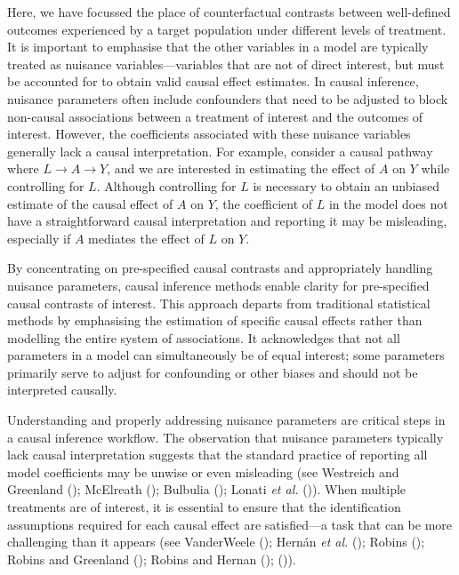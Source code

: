 \documentclass[
  singlecolumn]{article}
\begin{document}
Here, we have focussed the place of counterfactual contrasts between
well-defined outcomes experienced by a target population under different
levels of treatment. It is important to emphasise that the other
variables in a model are typically treated as nuisance
variables---variables that are not of direct interest, but must be
accounted for to obtain valid causal effect estimates. In causal
inference, nuisance parameters often include confounders that need to be
adjusted to block non-causal associations between a treatment of
interest and the outcomes of interest. However, the coefficients
associated with these nuisance variables generally lack a causal
interpretation. For example, consider a causal pathway where
\(L \to A \to Y\), and we are interested in estimating the effect of
\(A\) on \(Y\) while controlling for \(L\). Although controlling for
\(L\) is necessary to obtain an unbiased estimate of the causal effect
of \(A\) on \(Y\), the coefficient of \(L\) in the model does not have a
straightforward causal interpretation and reporting it may be
misleading, especially if \(A\) mediates the effect of \(L\) on \(Y\).

By concentrating on pre-specified causal contrasts and appropriately
handling nuisance parameters, causal inference methods enable clarity
for pre-specified causal contrasts of interest. This approach departs
from traditional statistical methods by emphasising the estimation of
specific causal effects rather than modelling the entire system of
associations. It acknowledges that not all parameters in a model can
simultaneously be of equal interest; some parameters primarily serve to
adjust for confounding or other biases and should not be interpreted
causally.

Understanding and properly addressing nuisance parameters are critical
steps in a causal inference workflow. The observation that nuisance
parameters typically lack causal interpretation suggests that the
standard practice of reporting all model coefficients may be unwise or
even misleading (see Westreich and Greenland
(); McElreath
(); Bulbulia
(); Lonati \emph{et al.}
()). When multiple
treatments are of interest, it is essential to ensure that the
identification assumptions required for each causal effect are
satisfied---a task that can be more challenging than it appears (see
VanderWeele (); Hernán \emph{et al.}
();
Robins (); Robins and Greenland
(); Robins and Hernan
();
()).
\end{document}
